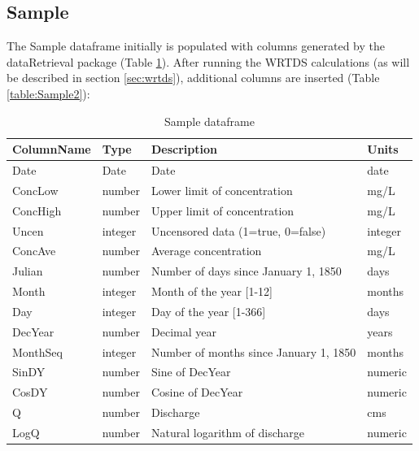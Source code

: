 \documentclass[a4paper,11pt]{article}\usepackage{graphicx, color}
\begin{document}
\FloatBarrier
\pagebreak


\subsection{Sample}
\label{sec:dataframesSample}
The Sample dataframe initially is populated with columns generated by the dataRetrieval package (Table \ref{table:Sample1}). After running the WRTDS calculations (as will be described in section \ref{sec:wrtds}), additional columns are inserted (Table \ref{table:Sample2}):

\begin{table}[!ht]
\begin{minipage}{\linewidth}
\centering
\caption{Sample dataframe} 
\label{table:Sample1}
\begin{tabular}{llll}
  \hline
ColumnName & Type & Description & Units \\ 
  \hline
Date & Date & Date & date \\ 
  ConcLow & number & Lower limit of concentration & mg/L \\ 
  ConcHigh & number & Upper limit of concentration & mg/L \\ 
  Uncen & integer & Uncensored data (1=true, 0=false) & integer \\ 
  ConcAve & number & Average concentration & mg/L \\ 
  Julian & number & Number of days since January 1, 1850 & days \\ 
  Month & integer & Month of the year [1-12] & months \\ 
  Day & integer & Day of the year [1-366] & days \\ 
  DecYear & number & Decimal year & years \\ 
  MonthSeq & integer & Number of months since January 1, 1850 & months \\ 
  SinDY & number & Sine of DecYear & numeric \\ 
  CosDY & number & Cosine of DecYear & numeric \\ 
  Q \footnotemark[1] & number & Discharge & cms \\ 
  LogQ \footnotemark[1] & number & Natural logarithm of discharge & numeric \\ 
   \hline
\end{tabular}
\end{minipage}
\end{table}
\end{document}
